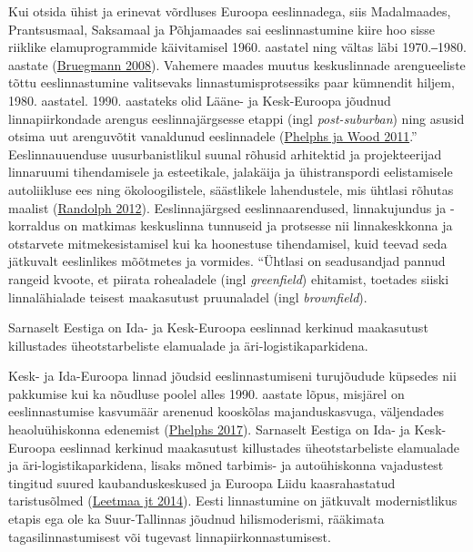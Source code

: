 \documentclass[estonian,]{article}
\begin{document}
Kui otsida ühist ja erinevat võrdluses Euroopa eeslinnadega, siis Madalmaades, Prantsusmaal, Saksamaal ja Põhjamaades sai eeslinnastumine kiire hoo sisse riiklike elamuprogrammide käivitamisel 1960. aastatel ning vältas läbi 1970.‒1980. aastate (\protect\hyperlink{Bruegmann2008}{Bruegmann 2008}). Vahemere maades muutus keskuslinnade arengueeliste tõttu eeslinnastumine valitsevaks linnastumisprotsessiks paar kümnendit hiljem, 1980. aastatel. 1990. aastateks olid Lääne- ja Kesk-Euroopa jõudnud linnapiirkondade arengus eeslinnajärgsesse etappi (ingl \emph{post-suburban}) ning asusid otsima uut arenguvõtit vanaldunud eeslinnadele (\protect\hyperlink{Phelps2011}{Phelphs ja Wood 2011}.'' Eeslinnauuenduse uusurbanistlikul suunal rõhusid arhitektid ja projekteerijad linnaruumi tihendamisele ja esteetikale, jalakäija ja ühistranspordi eelistamisele autoliikluse ees ning ökoloogilistele, säästlikele lahendustele, mis ühtlasi rõhutas maalist (\protect\hyperlink{Randolph2012}{Randolph 2012}). Eeslinnajärgsed eeslinnaarendused, linnakujundus ja -korraldus on matkimas keskuslinna tunnuseid ja protsesse nii linnakeskkonna ja otstarvete mitmekesistamisel kui ka hoonestuse tihendamisel, kuid teevad seda jätkuvalt eeslinlikes mõõtmetes ja vormides. ``Ühtlasi on seadusandjad pannud rangeid kvoote, et piirata rohealadele (ingl \emph{greenfield}) ehitamist, toetades siiski linnalähialade teisest maakasutust pruunaladel (ingl \emph{brownfield}).

\begin{blockquote-left}
Sarnaselt Eestiga on Ida- ja Kesk-Euroopa eeslinnad kerkinud maakasutust
killustades üheotstarbeliste elamualade ja äri-logistikaparkidena.
\end{blockquote-left}

Kesk- ja Ida-Euroopa linnad jõudsid eeslinnastumiseni turujõudude küpsedes nii pakkumise kui ka nõudluse poolel alles 1990. aastate lõpus, misjärel on eeslinnastumise kasvumäär arenenud kooskõlas majanduskasvuga, väljendades heaoluühiskonna edenemist (\protect\hyperlink{Phelps}{Phelphs 2017}). Sarnaselt Eestiga on Ida- ja Kesk-Euroopa eeslinnad kerkinud maakasutust killustades üheotstarbeliste elamualade ja äri-logistikaparkidena, lisaks mõned tarbimis- ja autoühiskonna vajadustest tingitud suured kaubanduskeskused ja Euroopa Liidu kaasrahastatud taristusõlmed (\protect\hyperlink{Leetmaa}{Leetmaa jt 2014}). Eesti linnastumine on jätkuvalt modernistlikus etapis ega ole ka Suur-Tallinnas jõudnud hilismoderismi, rääkimata tagasilinnastumisest või tugevast linnapiirkonnastumisest.
\end{document}
